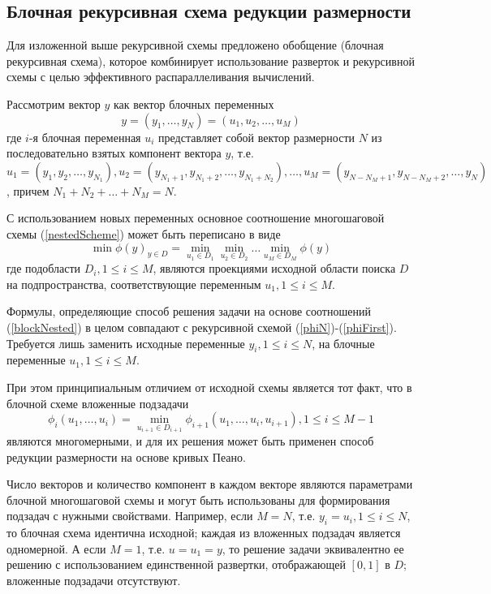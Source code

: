\documentclass[a4paper]{article}
\begin{document}
\subsection{Блочная рекурсивная схема редукции размерности}
Для изложенной выше рекурсивной схемы предложено обобщение (блочная рекурсивная схема), которое комбинирует использование разверток и рекурсивной схемы с целью эффективного распараллеливания вычислений.
\par
Рассмотрим вектор \(y\) как вектор блочных переменных
\begin{displaymath}
y=(y_1,\dots,y_N)=(u_1,u_2,\dots,u_M)
\end{displaymath}
где \(i\)-я блочная переменная \(u_i\) представляет собой вектор размерности \(N\) из последовательно взятых компонент вектора \(y\), т.е. \(u_1=(y_1,y_2,\dots,y_{N_1}),u_2=(y_{N_1+1},y_{N_1+2},\dots,y_{N_1+N_2}),\dots,u_M=(y_{N-N_M+1},y_{N-N_M+2},\dots,y_N)\), причем \(N_1+N_2+\dots+N_M=N\).
\par
С использованием новых переменных основное соотношение многошаговой схемы (\ref{nestedScheme}) может быть переписано в виде
\begin{equation}
\label{blockNested}
\min\phi(y)_{y\in D}=\min_{u_1\in D_1}\min_{u_2\in D_2}\dots\min_{u_M\in D_M}\phi(y)
\end{equation}
где подобласти \(D_i,1\leqslant i\leqslant M\), являются проекциями исходной области поиска \(D\) на подпространства, соответствующие переменным \(u_1,1\leqslant i\leqslant M\).
\par
Формулы, определяющие способ решения задачи на основе соотношений (\ref{blockNested}) в целом совпадают с рекурсивной схемой (\ref{phiN})-(\ref{phiFirst}). Требуется лишь заменить исходные переменные \(y_i,1\leqslant i\leqslant N\), на блочные переменные \(u_1,1\leqslant i\leqslant M\).
\par
При этом принципиальным отличием от исходной схемы является тот факт, что в блочной схеме вложенные подзадачи
\begin{equation}
\label{subTasks}
\phi_i(u_1,\dots,u_i)=\min_{u_{i+1}\in D_{i+1}}\phi_{i+1}(u_1,\dots,u_i,u_{i+1}),1\leqslant i\leqslant M-1
\end{equation}
являются многомерными, и для их решения может быть применен способ редукции размерности на основе кривых Пеано.
\par
Число векторов и количество компонент в каждом векторе являются параметрами блочной многошаговой схемы и могут быть использованы для формирования подзадач с нужными свойствами. Например, если \(M=N\), т.е. \(y_i=u_i,1\leqslant i\leqslant N\), то блочная схема идентична исходной; каждая из вложенных подзадач является одномерной. А если \(M=1\), т.е. \(u=u_1=y\), то решение задачи эквивалентно ее решению с использованием единственной развертки, отображающей \([0,1]\) в \(D\); вложенные подзадачи отсутствуют.
\end{document}
